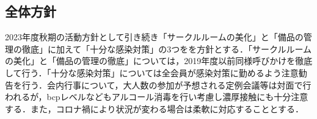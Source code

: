 \subsection*{全体方針}

2023年度秋期の活動方針として引き続き「サークルルームの美化」と「備品の管理の徹底」に加えて「十分な感染対策」の3つをを方針とする．「サークルルームの美化」と「備品の管理の徹底」については，2019年度以前同様呼びかけを徹底して行う．「十分な感染対策」については全会員が感染対策に勤めるよう注意勧告を行う．会内行事について，大人数の参加が予想される定例会議等は対面で行われるが，bcpレベルなどもアルコール消毒を行い考慮し濃厚接触にも十分注意する．また，コロナ禍により状況が変わる場合は柔軟に対応することとする．

